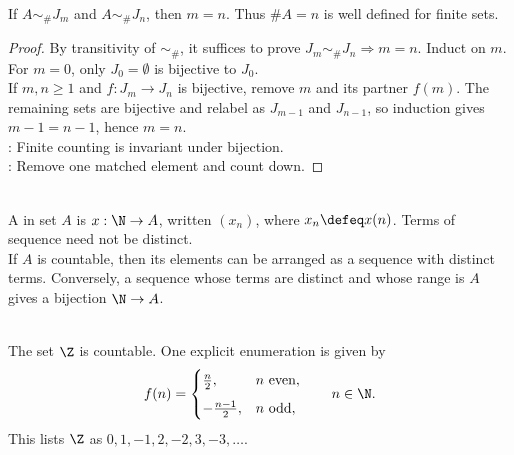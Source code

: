\begin{proposition} \label{prop:finite-cardinality-well-defined} \\
If $A\sim_{\#}J_m$ and $A\sim_{\#}J_n$, then $m=n$. Thus $\#A=n$ is well defined for finite sets.
\begin{proof}
By transitivity of $\sim_{\#}$, it suffices to prove $J_m\sim_{\#}J_n\Rightarrow m=n$. Induct on $m$.\\
For $m=0$, only $J_0=\emptyset$ is bijective to $J_0$.\\
If $m,n\geq1$ and $f:J_m\to J_n$ is bijective, remove $m$ and its partner $f(m)$. The remaining sets are bijective and relabel as $J_{m-1}$ and $J_{n-1}$, so induction gives $m-1=n-1$, hence $m=n$.\\
: Finite counting is invariant under bijection.\\
: Remove one matched element and count down.
\end{proof}
\end{proposition}

\begin{definition} \label{def:sequence-as-enumeration} \\
A  in set $A$ is $x:\N\to A$, written $(x_n)$, where $x_n\defeq x(n)$. Terms of sequence need not be distinct.\\
If $A$ is countable, then its elements can be arranged as a sequence with distinct terms. Conversely, a sequence whose terms are distinct and whose range is $A$ gives a bijection $\N\to A$.
\end{definition}

\begin{example} \label{ex:integers-are-countable} \\
The set $\Z$ is countable. One explicit enumeration is given by
\begin{align}
f(n)=
\begin{cases}
\frac{n}{2}, & n \text{ even},\\[2mm]
-\frac{n-1}{2}, & n \text{ odd},
\end{cases}
\qquad n\in\N. \nonumber
\end{align}
This lists $\Z$ as $0,1,-1,2,-2,3,-3,\ldots$.
\end{example}

